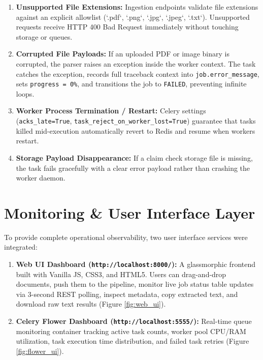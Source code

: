 \documentclass[peerreviewca]{IEEEtran}
\begin{document}
\begin{enumerate}
    \item \textbf{Unsupported File Extensions:} Ingestion endpoints validate file extensions against an explicit allowlist (`.pdf`, `.png`, `.jpg`, `.jpeg`, `.txt`). Unsupported requests receive HTTP 400 Bad Request immediately without touching storage or queues.
    \item \textbf{Corrupted File Payloads:} If an uploaded PDF or image binary is corrupted, the parser raises an exception inside the worker context. The task catches the exception, records full traceback context into \verb|job.error_message|, sets \verb|progress = 0%|, and transitions the job to \verb|FAILED|, preventing infinite loops.
    \item \textbf{Worker Process Termination / Restart:} Celery settings (\verb|acks_late=True|, \verb|task_reject_on_worker_lost=True|) guarantee that tasks killed mid-execution automatically revert to Redis and resume when workers restart.
    \item \textbf{Storage Payload Disappearance:} If a claim check storage file is missing, the task fails gracefully with a clear error payload rather than crashing the worker daemon.
\end{enumerate}

\section{Monitoring \& User Interface Layer}
\label{sec:monitoring}

To provide complete operational observability, two user interface services were integrated:

\begin{enumerate}
    \item \textbf{Web UI Dashboard (\texttt{http://localhost:8000/}):} A glassmorphic frontend built with Vanilla JS, CSS3, and HTML5. Users can drag-and-drop documents, push them to the pipeline, monitor live job status table updates via 3-second REST polling, inspect metadata, copy extracted text, and download raw text results (Figure \ref{fig:web_ui}).
    \item \textbf{Celery Flower Dashboard (\texttt{http://localhost:5555/}):} Real-time queue monitoring container tracking active task counts, worker pool CPU/RAM utilization, task execution time distribution, and failed task retries (Figure \ref{fig:flower_ui}).
\end{enumerate}
\end{document}

